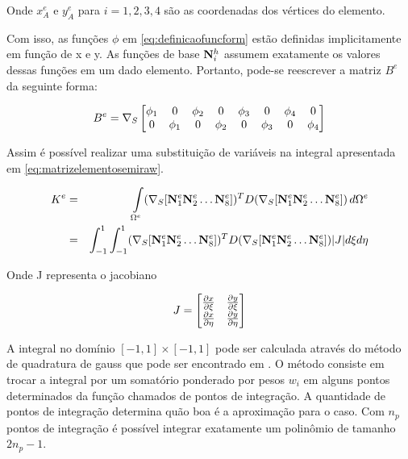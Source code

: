 Onde $x^e_A$ e $y^e_A$ para $i=1,2,3,4$ são as coordenadas dos vértices do elemento.

Com isso, as funções $\phi$ em \eqref{eq:definicaofuncform} estão definidas implicitamente em função de x e y. As funções de base $\basefunctionfine$ assumem exatamente os valores dessas funções em um dado elemento. Portanto, pode-se reescrever a matriz $B^e$ da seguinte forma:


\begin{equation} \label{eq:bephi}
    B^e = \sopnabla \begin{bmatrix}
\phi_1 & 0      & \phi_2 & 0 & \phi_3 & 0 & \phi_4 & 0\\
0      & \phi_1 & 0 & \phi_2 & 0 & \phi_3 & 0 & \phi_4
\end{bmatrix}
\end{equation}


Assim é possível realizar uma substituição de variáveis na integral apresentada em \eqref{eq:matrizelementosemiraw}.


\begin{eqnarray}
K^e     & = & \omeeint{ (\sopnabla [\basefunctionelem[1] \basefunctionelem[2] \hdots \basefunctionelem[8] ]) ^T D (\sopnabla [\basefunctionelem[1] \basefunctionelem[2] \hdots \basefunctionelem[8]])}   \\
        & = &  \intbase{(\sopnabla [\basefunctionelem[1] \basefunctionelem[2] \hdots \basefunctionelem[8] ]) ^T D (\sopnabla [\basefunctionelem[1] \basefunctionelem[2] \hdots \basefunctionelem[8]]) |J| }
\end{eqnarray}


Onde J representa o jacobiano

\begin{equation}
J = \begin{bmatrix}
\dxi[x]   &  \dxi[y]    \\
\deta[x]  &  \deta[y]
\end{bmatrix}
\label{eq:jacobiano}
\end{equation}


A integral no domínio $[-1, 1] \times [-1,1] $ pode ser calculada através do método de quadratura de gauss que pode ser encontrado em \cite{jacob}. O método consiste em trocar a integral por um somatório ponderado por pesos $w_i$ em alguns pontos determinados da função chamados de pontos de integração. A quantidade de pontos de integração determina quão boa é a aproximação para o caso. Com $n_p$ pontos de integração é possível integrar exatamente um
polinômio de tamanho $2n_p - 1$. %

